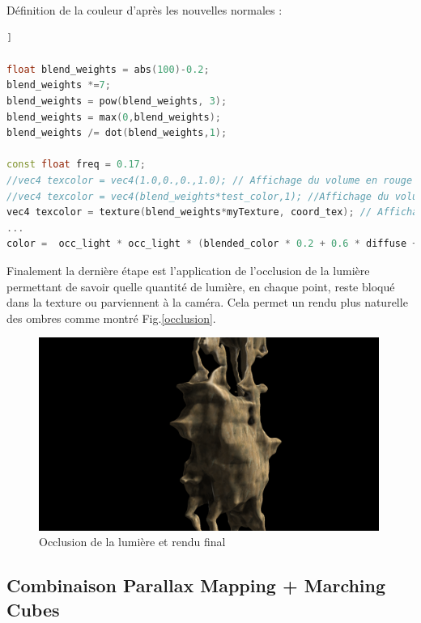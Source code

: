 \documentclass[a4paper]{article}
\begin{document}
Définition de la couleur d'après les nouvelles normales : 
\begin{lstlisting}[language=C++,
                   directivestyle={\color{black}}
                   emph={int,char,double,float,unsigned},
                   emphstyle={\color{blue}}]]
 
float blend_weights = abs(100)-0.2;
blend_weights *=7;
blend_weights = pow(blend_weights, 3);
blend_weights = max(0,blend_weights);
blend_weights /= dot(blend_weights,1);
  
const float freq = 0.17;
//vec4 texcolor = vec4(1.0,0.,0.,1.0); // Affichage du volume en rouge
//vec4 texcolor = vec4(blend_weights*test_color,1); //Affichage du volume avec couleurs par normales ponderees
vec4 texcolor = texture(blend_weights*myTexture, coord_tex); // Affichage du volume avec texture    
...
color =  occ_light * occ_light * (blended_color * 0.2 + 0.6 * diffuse + 0.3 * vec4(vec3(specular), 1.0));              
\end{lstlisting}

Finalement la dernière étape est l'application de l'occlusion de la lumière permettant de savoir quelle quantité de lumière, en chaque point, reste bloqué dans la texture ou parviennent à la caméra. Cela permet un rendu plus naturelle des ombres comme montré Fig.\ref{occlusion}.
\begin{figure}[H]
\centering
\label{normalt1} \includegraphics[width=0.99\textwidth]{figures/final.png}
\caption{Occlusion de la lumière et rendu final}
\label{normalestextures}
\end{figure}



\subsection{Combinaison Parallax Mapping + Marching Cubes}




\end{document}

